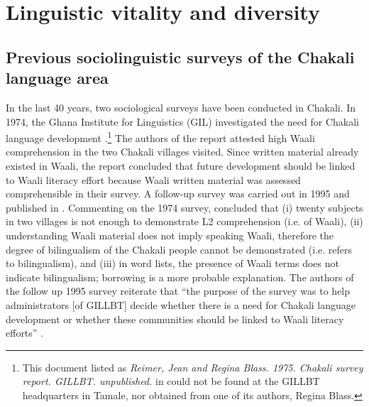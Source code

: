 


\section{Linguistic vitality and diversity}
\label{sec:SOC-unesco}


\subsection{Previous sociolinguistic surveys of the Chakali language area}
\label{sec:SOC-gil-socio}

In the last 40 years, two sociological surveys have been conducted in Chakali.
In 1974, the Ghana Institute for Linguistics (GIL) investigated the need for
Chakali
language development \citep{Reim75}.\footnote{This document  listed as {\it
Reimer,
Jean and Regina Blass. 1975. Chakali survey report. GILLBT. unpublished.}   in
\cite{Tomp02}  could not be found
at the GILLBT headquarters in Tamale, nor obtained from one of its authors,
Regina
Blass.} The authors
of the report attested high Waali comprehension in the two Chakali villages
visited. Since written material already existed in Waali, the report concluded
that future development should be linked to Waali literacy effort
because Waali written material was assessed comprehensible in their
survey. A follow-up survey was carried out in 1995 and published in  
\cite{Tomp02}. Commenting on the 1974 survey, \citeauthor{Tomp02} concluded 
that
(i) twenty
subjects in two villages is not enough to demonstrate L2 comprehension (i.e. of
Waali), (ii) understanding Waali material does not imply speaking Waali,
therefore the degree of  bilingualism of the Chakali people  cannot be
demonstrated (i.e. \cite{Reim75} refers to bilingualism), and (iii) in word
lists, the presence of Waali terms does not indicate bilingualism; borrowing
 is a more probable explanation. The authors of the follow up 1995 survey
reiterate that ``the purpose of the survey was to help
administrators [of GILLBT] decide whether there is a need for Chakali
language development or whether these communities should be linked to Waali
literacy efforts''  \citep[3]{Tomp02}. 

